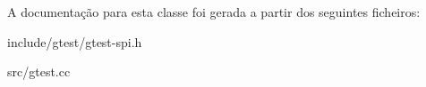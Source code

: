 A documentação para esta classe foi gerada a partir dos seguintes ficheiros\-:\begin{DoxyCompactItemize}
\item 
include/gtest/gtest-\/spi.\-h\item 
src/gtest.\-cc\end{DoxyCompactItemize}
